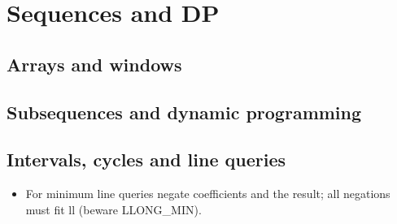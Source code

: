 \chapter{Sequences and DP}
\section{Arrays and windows}
\section{Subsequences and dynamic programming}
\section{Intervals, cycles and line queries}
\begin{itemize}[nosep,leftmargin=*]
\item For minimum line queries negate coefficients and the result;
 all negations must fit ll (beware LLONG\_MIN).
\end{itemize}

\par
